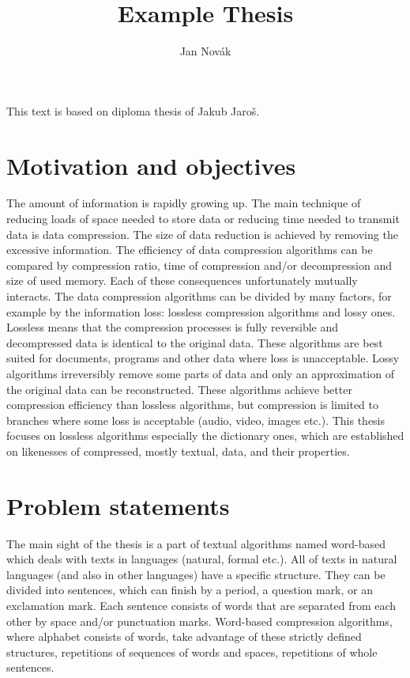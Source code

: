 \documentclass[thesis=M,english]{FITthesis}[2012/10/20]
\title{Example Thesis}
\author{Jan Novák} %
\begin{document}

\begin{introduction}
	This text is based on diploma thesis of Jakub Jaro{\v s}.
	\section{Motivation and objectives}

	The amount of information is rapidly growing up. The main technique of reducing loads of space needed to store data or reducing time needed to transmit data is data compression. The size of data reduction is achieved by removing the excessive information.
	The efficiency of data compression algorithms can be compared by compression ratio, time of compression and/or decompression and size of used memory. Each of these consequences unfortunately mutually interacts.
	The data compression algorithms can be divided by many factors, for example by the information loss: lossless compression algorithms and lossy ones. Lossless means that the compression processes is fully reversible and decompressed data is identical to the original data. These algorithms are best suited for documents, programs and other data where loss is unacceptable. Lossy algorithms irreversibly remove some parts of data and only an approximation of the original data can be reconstructed. These algorithms achieve better compression efficiency than lossless algorithms, but compression is limited to branches where some loss is acceptable (audio, video, images etc.).
	This thesis focuses on lossless algorithms especially the dictionary ones, which are established on likenesses of compressed, mostly textual, data, and their properties.

	\section{Problem statements}

	The main sight of the thesis is a part of textual algorithms named word-based which deals with texts in languages (natural, formal etc.). All of texts in natural languages (and also in other languages) have a specific structure. They can be divided into sentences, which can finish by a period, a question mark, or an exclamation mark. Each sentence consists of words that are separated from each other by space and/or punctuation marks.
	Word-based compression algorithms, where alphabet consists of words, take advantage of these strictly defined structures, repetitions of sequences of words and spaces, repetitions of whole sentences.

\end{introduction}
\end{document}
